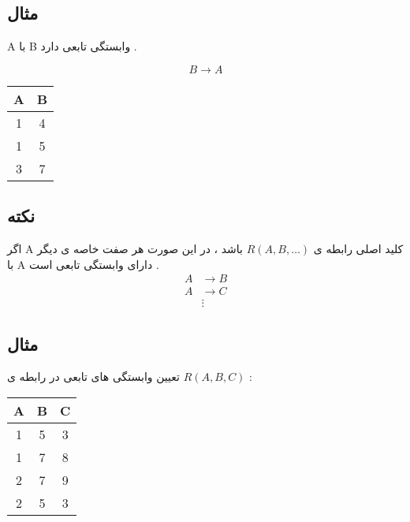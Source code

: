 \documentclass{article}
\begin{document}
\newpage

\subsection{مثال}

A با B وابستگی تابعی دارد .

$$
B \to A
$$

\begin{latin}
\begin{center}
  \bgroup
  \def\arraystretch{1.5}%
  \begin{tabular}{  c | c }
    A & B  \\
    \hline
    1 & 4  \\ 
    1 & 5  \\ 
    3 & 7  \\ 
  \end{tabular}
  \egroup
\end{center}
\end{latin}



\subsection{نکته}

اگر A کلید اصلی رابطه ی 
$R(A,B,\dots)$
 باشد ، در این صورت هر صفت خاصه ی دیگر با A دارای وابستگی تابعی است .
\begin{align*}
A &\to B \\
A &\to C \\
&\vdots
\end{align*}



\subsection{مثال}

تعیین وابستگی های تابعی در رابطه ی 
$R(A,B,C)$ :


\begin{latin}
\begin{center}
  \bgroup
  \def\arraystretch{1.5}%
  \begin{tabular}{  c | c | c }
    A & B & C \\
    \hline
    1 & 5 & 3 \\ 
    1 & 7 & 8 \\ 
    2 & 7 & 9 \\ 
    2 & 5 & 3 \\
  \end{tabular}
  \egroup
\end{center}
\end{latin}
\end{document}
